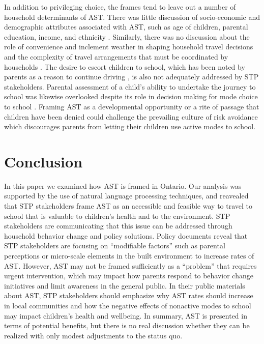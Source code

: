 \documentclass[preprint, 3p,
authoryear]{elsarticle} %
\begin{document}
In addition to privileging choice, the frames tend to leave out a number
of household determinants of AST. There was little discussion of
socio-economic and demographic attributes associated with AST, such as
age of children, parental education, income, and ethnicity
\citep{rothmanDeclineActiveSchool2018}. Similarly, there was no
discussion about the role of convenience and inclement weather in
shaping household travel decisions
\citep{buliungSchoolTravelPlanning2011} and the complexity of travel
arrangements that must be coordinated by households
\citep[see][]{buliungLivingJourneySchool2021}. The desire to escort
children to school, which has been noted by parents as a reason to
continue driving \citep{westmanWhatDrivesThem2017}, is also not
adequately addressed by STP stakeholders. Parental assessment of a
child's ability to undertake the journey to school was likewise
overlooked despite its role in decision making for mode choice to school
\citep{faulknerWhatQuickestEasiest2010}. Framing AST as a developmental
opportunity or a rite of passage that children have been denied could
challenge the prevailing culture of risk avoidance which discourages
parents from letting their children use active modes to school.

\hypertarget{conclusion}{%
\section{Conclusion}\label{conclusion}}

In this paper we examined how AST is framed in Ontario. Our analysis was
supported by the use of natural language processing techniques, and
reavealed that STP stakeholders frame AST as an accessible and feasible
way to travel to school that is valuable to children's health and to the
environment. STP stakeholders are communicating that this issue can be
addressed through household behavior change and policy solutions. Policy
documents reveal that STP stakeholders are focusing on ``modifiable
factors'' such as parental perceptions or micro-scale elements in the
built environment to increase rates of AST. However, AST may not be
framed sufficiently as a ``problem'' that requires urgent intervention,
which may impact how parents respond to behavior change initiatives and
limit awareness in the general public. In their public materials about
AST, STP stakeholders should emphasize why AST rates should increase in
local communities and how the negative effects of nonactive modes to
school may impact children's health and wellbeing. In summary, AST is
presented in terms of potential benefits, but there is no real
discussion whether they can be realized with only modest adjustments to
the status quo.
\end{document}
